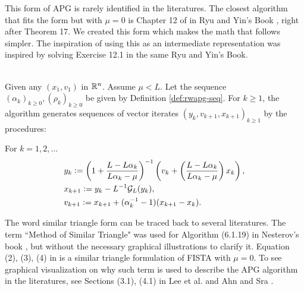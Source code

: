 \documentclass[12pt]{article}
\begin{document}
        \begin{remark}
            This form of APG is rarely identified in the literatures.
            The closest algorithm that fits the form but with $\mu = 0$ is Chapter 12 of in Ryu and Yin's Book \cite{ryu_large-scale_2022}, right after Theorem 17.
            We created this form which makes the math that follows simpler.
            The inspiration of using this as an intermediate representation was inspired by solving Exercise 12.1 in the same Ryu and Yin's Book.
        \end{remark}
        \begin{definition}\label{def:r-wapg-st-form} \; \\
            Given any $(x_1, v_1)$ in $\mathbb R^n$.
            Assume $\mu < L$.
            Let the sequence $(\alpha_k)_{k \ge 0}, (\rho_k)_{k\ge 0}$ be given by Definition \ref{def:rwapg-seq}.
            For $k \ge 1$, the algorithm generates sequences of vector iterates $(y_k, v_{k + 1}, x_{k + 1})_{k \ge 1}$ by the procedures:
            \begin{tcolorbox}
                For $k=1, 2, \ldots $
                \begin{align*}
                    & y_k \vcentcolon=
                    \left(
                        1 + \frac{L - L\alpha_k}{L\alpha_k - \mu}
                    \right)^{-1}
                    \left(
                        v_k +
                        \left(\frac{L - L\alpha_k}{L\alpha_k - \mu} \right) x_k
                    \right),
                    \\
                    & x_{k + 1} \vcentcolon=
                    y_k - L^{-1} \mathcal G_L (y_k),
                    \\
                    & v_{k + 1} \vcentcolon=
                    x_{k + 1} + (\alpha_k^{-1} -1)(x_{k + 1} - x_k).
                \end{align*}
            \end{tcolorbox}
        \end{definition}
        \begin{remark}
            The word similar triangle form can be traced back to several literatures.
            The term ``Method of Similar Triangle" was used for Algorithm (6.1.19) in Nesterov's book \cite{nesterov_lectures_2018}, but without the necessary graphical illustrations to clarify it.
            Equation (2), (3), (4) in \cite{chambolle_convergence_2015} is a similar triangle formulation of FISTA with $\mu = 0$.
            To see graphical visualization on why such term is used to describe the APG algorithm in the literatures, see
            Sections (3.1), (4.1) in Lee et al. \cite{lee_geometric_2021} and Ahn and Sra \cite{ahn_understanding_2022}.
        \end{remark}
\end{document}
